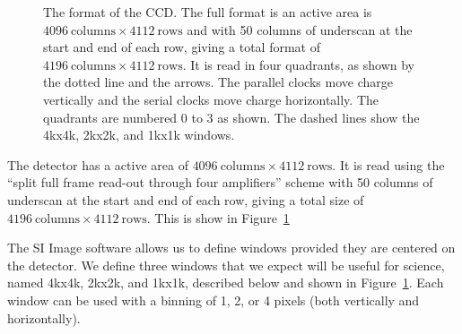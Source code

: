 \documentclass{article}
\newcommand{\code}[1]{{\ttfamily #1}}
\begin{document}
\begin{figure}[p]
\begin{center}
\caption{The format of the CCD. The full format is an active area is $4096~\mbox{columns} \times 4112~\mbox{rows}$ and with 50 columns of underscan at the start and end of each row, giving a total format of $4196~\mbox{columns} \times 4112~\mbox{rows}$. It is read in four quadrants, as shown by the dotted line and the arrows. The parallel clocks move charge vertically and the serial clocks move charge horizontally. The quadrants are numbered 0 to 3 as shown. The dashed lines show the \code{4kx4k}, \code{2kx2k}, and \code{1kx1k} windows.}
\label{figure:format}
\end{center}
\end{figure}

The detector has a active area of  $4096~\mbox{columns} \times 4112~\mbox{rows}$. It is read using the “split full frame read-out through four amplifiers” scheme \cite[p.~17]{e2v} with 50 columns of underscan at the start and end of each row, giving a total size of $4196~\mbox{columns} \times 4112~\mbox{rows}$. This is show in Figure~\ref{figure:format}

The SI Image software allows us to define windows provided they are centered on the detector. We define three windows that we expect will be useful for science, named \code{4kx4k}, \code{2kx2k}, and \code{1kx1k}, described below and shown in Figure~\ref{figure:format}. Each window can be used with a binning of 1, 2, or 4 pixels (both vertically and horizontally).
\end{document}

